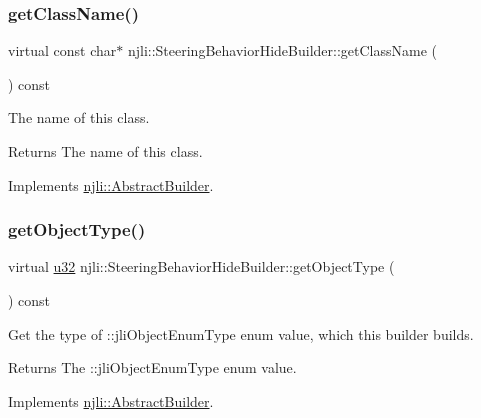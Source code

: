 \subsubsection{\texorpdfstring{get\+Class\+Name()}{getClassName()}}
{\footnotesize\ttfamily virtual const char$\ast$ njli\+::\+Steering\+Behavior\+Hide\+Builder\+::get\+Class\+Name (\begin{DoxyParamCaption}{ }\end{DoxyParamCaption}) const\hspace{0.3cm}{\ttfamily [virtual]}}

The name of this class.

\begin{DoxyReturn}{Returns}
The name of this class. 
\end{DoxyReturn}


Implements \mbox{\hyperlink{classnjli_1_1_abstract_builder_a902f73ea78031b06aca183a417f3413b}{njli\+::\+Abstract\+Builder}}.

\mbox{\label{classnjli_1_1_steering_behavior_hide_builder_ab3b080cf4885df0292810ea80086bd87}} 
\subsubsection{\texorpdfstring{get\+Object\+Type()}{getObjectType()}}
{\footnotesize\ttfamily virtual \mbox{\hyperlink{_util_8h_a10e94b422ef0c20dcdec20d31a1f5049}{u32}} njli\+::\+Steering\+Behavior\+Hide\+Builder\+::get\+Object\+Type (\begin{DoxyParamCaption}{ }\end{DoxyParamCaption}) const\hspace{0.3cm}{\ttfamily [virtual]}}

Get the type of \+::jli\+Object\+Enum\+Type enum value, which this builder builds.

\begin{DoxyReturn}{Returns}
The \+::jli\+Object\+Enum\+Type enum value. 
\end{DoxyReturn}


Implements \mbox{\hyperlink{classnjli_1_1_abstract_builder_a0f2d344fcf697b167f4f2b1122b5fb33}{njli\+::\+Abstract\+Builder}}.

